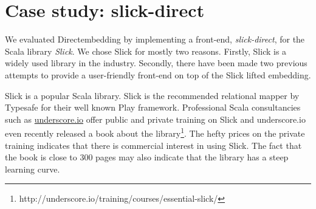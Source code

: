 \section{Case study: slick-direct} %
\label{sec:CaseStudy}
We evaluated Directembedding by implementing a front-end, \emph{slick-direct}, for the Scala library \emph{Slick}.
We chose Slick for mostly two reasons.
Firstly, Slick is a widely used library in the industry.
Secondly, there have been made two previous attempts to provide a user-friendly front-end on top of the Slick lifted embedding.

Slick is a popular Scala library.
Slick is the recommended relational mapper by Typesafe for their well known Play framework.
Professional Scala consultancies such as \href{http://underscore.io}{underscore.io} offer public and private training on Slick and underscore.io even recently released a book about the library\footnote{http://underscore.io/training/courses/essential-slick/}.
The hefty prices on the private training indicates that there is commercial interest in using Slick.
The fact that the book is close to 300 pages may also indicate that the library has a steep learning curve.

